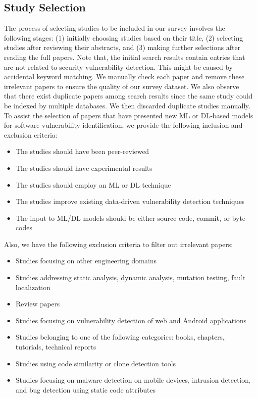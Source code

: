 {\subsection{Study Selection}
The process of selecting studies to be included in our survey involves the following stages: (1) initially choosing studies based on their title, (2) selecting studies after reviewing their abstracts, and (3) making further selections after reading the full papers. Note that, the initial search results contain entries that are not related to security vulnerability detection. This might be caused by accidental keyword matching. We manually check each paper and remove these irrelevant papers to ensure the quality of our survey dataset. We also observe that there exist duplicate papers among search results  since the same study could be indexed by multiple databases. We then discarded duplicate studies manually. 
To assist the selection of papers that have presented new ML or DL-based models for software vulnerability identification, we provide the following inclusion and exclusion criteria:
\begin{itemize}
\item The studies should have been peer-reviewed 
    \item The studies should have experimental results
    \item The studies should employ an ML or DL technique
    \item The studies improve existing data-driven vulnerability detection techniques
    \item The input to ML/DL models should be either source code, commit, or byte-codes
\end{itemize}

Also, we have the following exclusion criteria to filter out irrelevant papers:

\begin{itemize}
    \item Studies focusing on other engineering domains
    \item Studies addressing static analysis, dynamic analysis, mutation testing, fault localization
    \item Review papers
    \item Studies focusing on vulnerability detection of web and Android applications
    \item Studies belonging to one of the following categories: books, chapters, tutorials, technical reports
    \item Studies using code similarity or clone detection tools
    \item Studies focusing on malware detection on mobile devices, intrusion detection, and bug detection using static code attributes
\end{itemize}

}
